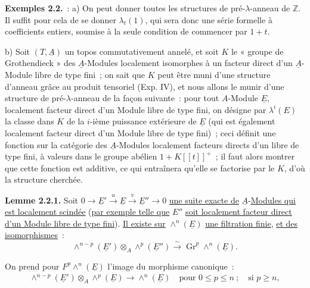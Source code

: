 
\textbf{Exemples 2.2.}~: a) On peut donner toutes les structures de pré-\(\lambda\)-anneau de \(\mathbb Z\). Il suffit pour cela de se donner \(\lambda_t(1)\), qui sera donc une série formelle à coefficients entiers, soumise à la seule condition de commencer par \(1+t\).

b) Soit \((T,\underline{A})\) un topos commutativement annelé, et soit \(K\) le « groupe de Grothendieck » des \(\underline{A}\)-Modules localement isomorphes à un facteur direct d'un \(\underline{A}\)-Module libre de type fini~; on sait que \(K\) peut être muni d'une structure d'anneau grâce au produit tensoriel (Exp. IV), et nous allons le munir d'une structure de pré-\(\lambda\)-anneau de la façon suivante~: pour tout \(A\)-Module \(\underline{E}\), localement facteur direct d'un Module libre de type fini, on désigne par \(\lambda^i(E)\) la classe dans \(K\) de la \(i\)-ième puissance extérieure de \(\underline{E}\) (qui est également localement facteur direct d'un Module libre de type fini)~; ceci définit une fonction sur la catégorie des \(\underline{A}\)-Modules localement facteurs directs d'un libre de type fini, à valeurs dans le groupe abélien \(1+K[[t]]^+\)~; il faut alors montrer que cette fonction est additive, ce qui entraînera qu'elle se factorise par le \(K\), d'où la structure cherchée.

\textbf{Lemme 2.2.1.} Soit \(0\longrightarrow \underline{E}' \xrightarrow{u} \underline{E} \xrightarrow{v} \underline{E}''\longrightarrow0\) \uline{une suite exacte de} \(\underline{A}\)-\uline{Modules qui est localement scindée} (\uline{par exemple telle que} \(E''\) \uline{soit localement facteur direct d'un Module libre de type fini}). \uline{Il existe sur} \(\wedge^n(\underline{E})\) \uline{une filtration finie}, \uline{et des isomorphismes}~:
\[
  \wedge^{n-p}(\underline{E}')\otimes_A\wedge^p(\underline{E}'')
  \xrightarrow{\sim}
  \operatorname{Gr}^p\wedge^n(\underline{E}).
\]

On prend pour \(F^p\wedge^n(\underline{E})\) l'image du morphisme canonique~:
\[
\begin{gathered}
  \wedge^{n-p}(\underline{E}')\otimes_A\wedge^p(\underline{E})\longrightarrow\wedge^n(\underline{E})
  \quad\text{pour } 0\leq p\leq n\ ;\quad \text{si } p\geq n,
\end{gathered}
\]
